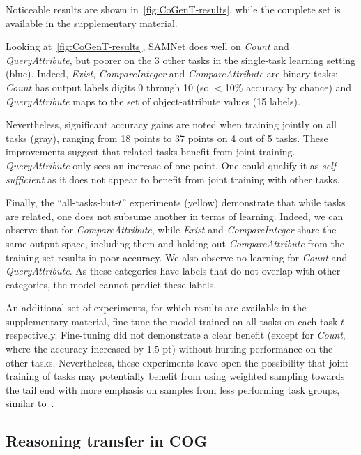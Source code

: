 Noticeable results are shown in~\cref{fig:CoGenT-results}, while the complete set is available in the supplementary material.

Looking at~\cref{fig:CoGenT-results}, SAMNet does well on \textit{Count} and \textit{QueryAttribute}, but poorer on the 3 other tasks in the single-task learning setting (blue). Indeed, \textit{Exist}, \textit{CompareInteger} and \textit{CompareAttribute} are binary tasks; \textit{Count} has output labels digits 0 through 10 (so $<$10\% accuracy by chance) and \textit{QueryAttribute} maps to the set of object-attribute values (15 labels).

Nevertheless, significant accuracy gains are noted when training jointly on all tasks (gray), ranging from 18 points to 37 points on 4 out of 5 tasks. These improvements suggest that related tasks benefit from joint training. \textit{QueryAttribute} only sees an increase of one point. One could qualify it as \textit{self-sufficient} as it does not appear to benefit from joint training with other tasks.

Finally, the ``all-tasks-but-$t$'' experiments (yellow) demonstrate that while tasks are related, one does not subsume another in terms of learning. Indeed, we can observe that for \textit{CompareAttribute}, while \textit{Exist} and \textit{CompareInteger} share the same output space, including them and holding out \textit{CompareAttribute} from the training set results in poor accuracy.
We also observe no learning for \textit{Count} and \textit{QueryAttribute}. As these categories have labels that do not overlap with other categories, the model cannot predict these labels.

An additional set of experiments, for which results are available in the supplementary material, fine-tune the model trained on all tasks on each task $t$ respectively.
Fine-tuning did not demonstrate a clear benefit (except for \textit{Count}, where the accuracy increased by 1.5 pt) without hurting performance on the other tasks. Nevertheless, these experiments leave open the possibility that joint training of tasks may potentially benefit from using weighted sampling towards the tail end with more emphasis on samples from less performing task groups, similar to~\cite{guo2018dynamic, kendall2018multi}.

\subsection{Reasoning transfer in COG}
\label{sec:reasoning-cog}

